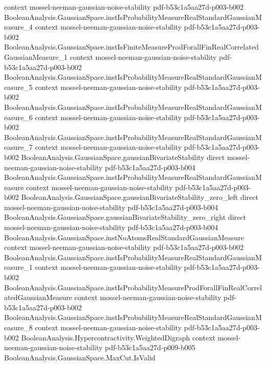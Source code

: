 \begin{theorem}
  {context}
  {mossel-neeman-gaussian-noise-stability}
  {pdf-b53c1a5aa27d-p003-b002}
\proofstep
  {BooleanAnalysis.GaussianSpace.instIsProbabilityMeasureRealStandardGaussianMeasure_4}
  {context}
  {mossel-neeman-gaussian-noise-stability}
  {pdf-b53c1a5aa27d-p003-b002}
\proofstep
  {BooleanAnalysis.GaussianSpace.instIsFiniteMeasureProdForallFinRealCorrelatedGaussianMeasure_1}
  {context}
  {mossel-neeman-gaussian-noise-stability}
  {pdf-b53c1a5aa27d-p003-b002}
\proofstep
  {BooleanAnalysis.GaussianSpace.instIsProbabilityMeasureRealStandardGaussianMeasure_5}
  {context}
  {mossel-neeman-gaussian-noise-stability}
  {pdf-b53c1a5aa27d-p003-b002}
\proofstep
  {BooleanAnalysis.GaussianSpace.instIsProbabilityMeasureRealStandardGaussianMeasure_6}
  {context}
  {mossel-neeman-gaussian-noise-stability}
  {pdf-b53c1a5aa27d-p003-b002}
\proofstep
  {BooleanAnalysis.GaussianSpace.instIsProbabilityMeasureRealStandardGaussianMeasure_7}
  {context}
  {mossel-neeman-gaussian-noise-stability}
  {pdf-b53c1a5aa27d-p003-b002}
\proofstep
  {BooleanAnalysis.GaussianSpace.gaussianBivariateStability}
  {direct}
  {mossel-neeman-gaussian-noise-stability}
  {pdf-b53c1a5aa27d-p003-b004}
\proofstep
  {BooleanAnalysis.GaussianSpace.instIsProbabilityMeasureRealStandardGaussianMeasure}
  {context}
  {mossel-neeman-gaussian-noise-stability}
  {pdf-b53c1a5aa27d-p003-b002}
\proofstep
  {BooleanAnalysis.GaussianSpace.gaussianBivariateStability_zero_left}
  {direct}
  {mossel-neeman-gaussian-noise-stability}
  {pdf-b53c1a5aa27d-p003-b004}
\proofstep
  {BooleanAnalysis.GaussianSpace.gaussianBivariateStability_zero_right}
  {direct}
  {mossel-neeman-gaussian-noise-stability}
  {pdf-b53c1a5aa27d-p003-b004}
\proofstep
  {BooleanAnalysis.GaussianSpace.instNoAtomsRealStandardGaussianMeasure}
  {context}
  {mossel-neeman-gaussian-noise-stability}
  {pdf-b53c1a5aa27d-p003-b002}
\proofstep
  {BooleanAnalysis.GaussianSpace.instIsProbabilityMeasureRealStandardGaussianMeasure_1}
  {context}
  {mossel-neeman-gaussian-noise-stability}
  {pdf-b53c1a5aa27d-p003-b002}
\proofstep
  {BooleanAnalysis.GaussianSpace.instIsProbabilityMeasureProdForallFinRealCorrelatedGaussianMeasure}
  {context}
  {mossel-neeman-gaussian-noise-stability}
  {pdf-b53c1a5aa27d-p003-b002}
\proofstep
  {BooleanAnalysis.GaussianSpace.instIsProbabilityMeasureRealStandardGaussianMeasure_8}
  {context}
  {mossel-neeman-gaussian-noise-stability}
  {pdf-b53c1a5aa27d-p003-b002}
\proofstep
  {BooleanAnalysis.Hypercontractivity.WeightedDigraph}
  {context}
  {mossel-neeman-gaussian-noise-stability}
  {pdf-b53c1a5aa27d-p009-b005}
\proofstep
  {BooleanAnalysis.GaussianSpace.MaxCut.IsValid}

\end{theorem}
